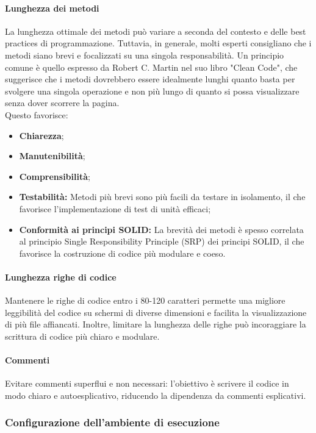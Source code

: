 \documentclass{article}
\begin{document}
\paragraph*{Lunghezza dei metodi}
La lunghezza ottimale dei metodi può variare a seconda del contesto e delle best practices di programmazione. Tuttavia, in generale, molti esperti consigliano che i metodi siano brevi e focalizzati su una singola responsabilità.
Un principio comune è quello espresso da Robert C. Martin nel suo libro "Clean Code", che suggerisce che i metodi dovrebbero essere idealmente lunghi quanto basta per svolgere una singola operazione e non più lungo di quanto si possa visualizzare senza dover scorrere la pagina. \\
Questo favorisce:
\begin{itemize}
    \item \textbf{Chiarezza};
    \item \textbf{Manutenibilità};
    \item \textbf{Comprensibilità};
    \item \textbf{Testabilità:} Metodi più brevi sono più facili da testare in isolamento, il che favorisce l'implementazione di test di unità efficaci;
    \item \textbf{Conformità ai principi SOLID:} La brevità dei metodi è spesso correlata al principio Single Responsibility Principle (SRP) dei principi SOLID, il che favorisce la costruzione di codice più modulare e coeso.
\end{itemize} 

\paragraph*{Lunghezza righe di codice}
Mantenere le righe di codice entro i 80-120 caratteri permette una migliore leggibilità del codice su schermi di diverse dimensioni e facilita la visualizzazione di più file affiancati.
Inoltre, limitare la lunghezza delle righe può incoraggiare la scrittura di codice più chiaro e modulare.
\paragraph{Commenti}
Evitare commenti superflui e non necessari: l'obiettivo è scrivere il codice in modo chiaro e autoesplicativo, riducendo la dipendenza da commenti esplicativi. 
\subsubsection{Configurazione dell'ambiente di esecuzione}
\end{document}
